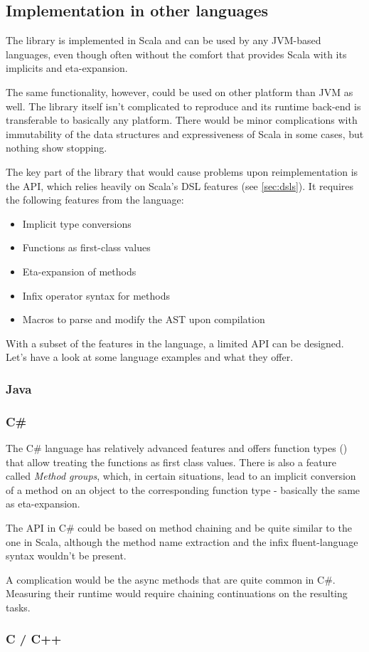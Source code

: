 \subsection{Implementation in other languages}

The library is implemented in Scala and can be used by any JVM-based languages, even though often without the comfort that provides Scala with its implicits and eta-expansion.

The same functionality, however, could be used on other platform than JVM as well. The library itself isn't complicated to reproduce and its runtime back-end is transferable to basically any platform. There would be minor complications with immutability of the data structures and expressiveness of Scala in some cases, but nothing show stopping.

The key part of the library that would cause problems upon reimplementation is the API, which relies heavily on Scala's DSL features (see \ref{sec:dsls}). It requires the following features from the language:

\begin{itemize}
	\item Implicit type conversions
	\item Functions as first-class values
	\item Eta-expansion of methods
	\item Infix operator syntax for methods
	\item Macros to parse and modify the AST upon compilation
\end{itemize}

With a subset of the features in the language, a limited API can be designed. Let's have a look at some language examples and what they offer.

\subsubsection{Java}

\subsubsection{C\#}

The C\# language has relatively advanced features and offers function types () that allow treating the functions as first class values. There is also a feature called \textit{Method groups}, which, in certain situations, lead to an implicit conversion of a method on an object to the corresponding function type - basically the same as eta-expansion.


The API in C\# could be based on method chaining and be quite similar to the one in Scala, although the method name extraction and the infix fluent-language syntax wouldn't be present.

A complication would be the async methods that are quite common in C\#. Measuring their runtime would require chaining continuations on the resulting tasks.

\subsubsection{C / C++}